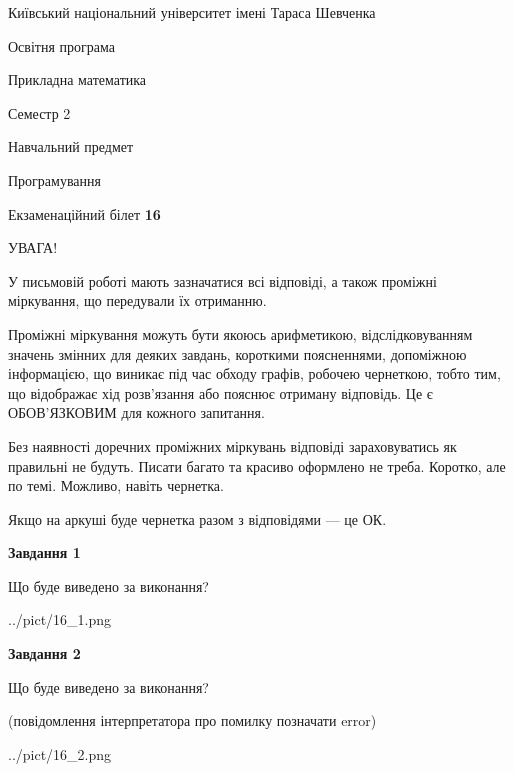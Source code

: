 \documentclass[12pt, ukrainian]{article}
\begin{document}
{{\begin {small}\par
{ \center  Київський національний університет імені Тараса Шевченка \par}
{\parbox {5 cm}{Освітня програма \hfill}{\parbox {7 cm}{Прикладна математика\hfill}}\parbox {6 cm}{\hfill Семестр 2}}\par
{\parbox {5 cm} {Навчальний предмет \hfill}\parbox {7 cm}{Програмування \hfill}\parbox {6cm}{\hfill}\par}\vspace{-7pt} \end{small}}{\center Екзаменаційний білет \No \textbf
{ 16 }\par}}
{
\begin {large}
УВАГА!

У письмовій роботі мають зазначатися всі відповіді, а також проміжні міркування, що передували їх отриманню.

Проміжні міркування можуть бути якоюсь арифметикою, відслідковуванням зна\-чень змінних для деяких завдань,
короткими поясненнями, допоміжною інформацією, що виникає під час обходу графів, робочею чернеткою,
тобто тим, що відображає хід розв’язання або пояснює отриману відповідь.
Це є ОБОВ’ЯЗКОВИМ для кожного запитання.

Без наявності доречних проміжних міркувань відповіді зараховуватись як правиль\-ні не будуть.
Писати багато та красиво оформлено не треба. Коротко, але по темі. Можли\-во, навіть чернетка.

Якщо на аркуші буде чернетка разом з відповідями --- це ОК.

\newpage

{\begin {center}\textbf{Завдання 1}\end {center}}\par
Що буде виведено за виконання?\par
\begin{center}
	{../pict/16_1.png}
\end{center}
\newpage

{\begin {center}\textbf{Завдання 2}\end {center}}\par
Що буде виведено за виконання?\par
 (повідомлення інтерпретатора про помилку позначати error)\par
\begin{center}
	{../pict/16_2.png}
\end{center}
\newpage


\end{large}}
\end{document}

